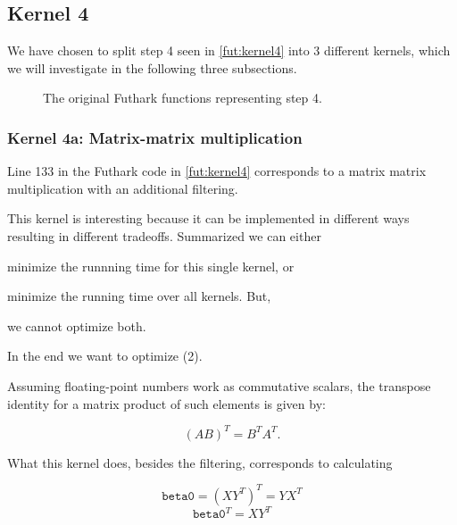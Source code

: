 \subsection{Kernel 4}

We have chosen to split step 4 seen in \autoref{fut:kernel4} into 3 different
kernels, which we will investigate in the following three subsections.

\begin{figure}[H]
    \centering
    \caption{The original Futhark functions representing step 4.}
    \label{fut:kernel4}
\end{figure}

\subsubsection{Kernel 4a:  Matrix-matrix multiplication}

\begin{figure}[H]
    \centering
    \caption{}
    \label{fut:kernel4a}
\end{figure}


Line 133 in the Futhark code in \autoref{fut:kernel4} corresponds to a matrix
matrix multiplication with an additional filtering. 

This kernel is interesting because it can be implemented in different ways
resulting in different tradeoffs. Summarized we can either 

\begin{enumerate*}
    \item minimize the runnning time for this single kernel, or
    \item minimize the running time over all kernels. But,
    \item we cannot optimize both.
\end{enumerate*}

In the end we want to optimize (2).

Assuming floating-point numbers work as commutative scalars, the transpose
identity for a matrix product of such elements is given by:

\[ (AB)^T = B^T A^T. \]

What this kernel does, besides the filtering, corresponds to calculating

\[ \texttt{beta0} = (XY^T)^T = YX^T \]
\[ \texttt{beta0}^T = XY^T \]

